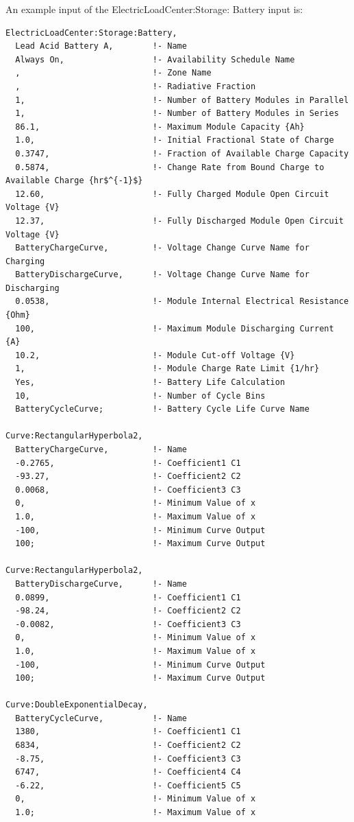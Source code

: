 An example input of the ElectricLoadCenter:Storage: Battery input is:

\begin{lstlisting}
ElectricLoadCenter:Storage:Battery,
  Lead Acid Battery A,        !- Name
  Always On,                  !- Availability Schedule Name
  ,                           !- Zone Name
  ,                           !- Radiative Fraction
  1,                          !- Number of Battery Modules in Parallel
  1,                          !- Number of Battery Modules in Series
  86.1,                       !- Maximum Module Capacity {Ah}
  1.0,                        !- Initial Fractional State of Charge
  0.3747,                     !- Fraction of Available Charge Capacity
  0.5874,                     !- Change Rate from Bound Charge to Available Charge {hr$^{-1}$}
  12.60,                      !- Fully Charged Module Open Circuit Voltage {V}
  12.37,                      !- Fully Discharged Module Open Circuit Voltage {V}
  BatteryChargeCurve,         !- Voltage Change Curve Name for Charging
  BatteryDischargeCurve,      !- Voltage Change Curve Name for Discharging
  0.0538,                     !- Module Internal Electrical Resistance {Ohm}
  100,                        !- Maximum Module Discharging Current {A}
  10.2,                       !- Module Cut-off Voltage {V}
  1,                          !- Module Charge Rate Limit {1/hr}
  Yes,                        !- Battery Life Calculation
  10,                         !- Number of Cycle Bins
  BatteryCycleCurve;          !- Battery Cycle Life Curve Name

Curve:RectangularHyperbola2,
  BatteryChargeCurve,         !- Name
  -0.2765,                    !- Coefficient1 C1
  -93.27,                     !- Coefficient2 C2
  0.0068,                     !- Coefficient3 C3
  0,                          !- Minimum Value of x
  1.0,                        !- Maximum Value of x
  -100,                       !- Minimum Curve Output
  100;                        !- Maximum Curve Output

Curve:RectangularHyperbola2,
  BatteryDischargeCurve,      !- Name
  0.0899,                     !- Coefficient1 C1
  -98.24,                     !- Coefficient2 C2
  -0.0082,                    !- Coefficient3 C3
  0,                          !- Minimum Value of x
  1.0,                        !- Maximum Value of x
  -100,                       !- Minimum Curve Output
  100;                        !- Maximum Curve Output

Curve:DoubleExponentialDecay,
  BatteryCycleCurve,          !- Name
  1380,                       !- Coefficient1 C1
  6834,                       !- Coefficient2 C2
  -8.75,                      !- Coefficient3 C3
  6747,                       !- Coefficient4 C4
  -6.22,                      !- Coefficient5 C5
  0,                          !- Minimum Value of x
  1.0;                        !- Maximum Value of x
\end{lstlisting}

